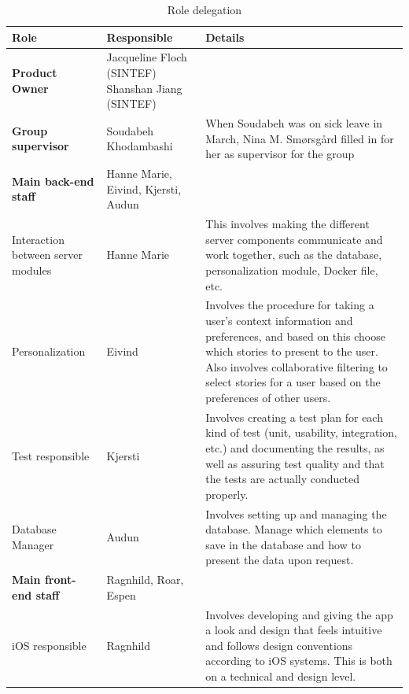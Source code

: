 \begin{table}[!h]
	\small
	\centering
		\caption{Role delegation}
		\begin{tabular}{ | p{2.5cm} | p{2.8cm} | p{12cm} |}
			\hline
			\textbf{Role} & \textbf{Responsible} & \textbf{Details} \\ \hline
			
			\textbf{Product Owner} & Jacqueline Floch (SINTEF) \newline Shanshan Jiang (SINTEF) & \\ \hline
			
			\textbf{Group supervisor} & Soudabeh Khodambashi & When Soudabeh was on sick leave in March, Nina M. Smørsgård filled in for her as supervisor for the group\\ \hline
			
			\textbf{Main back-end staff} & Hanne Marie, Eivind, Kjersti, Audun & \\ \hline
			
			Interaction between server modules & Hanne Marie & This involves making the different server components communicate and work together, such as the database, personalization module, Docker file, etc. \\ \hline
			
			Personalization & Eivind & Involves the procedure for taking a user's context information and preferences, and based on this choose which stories to present to the user. Also involves collaborative filtering to select stories for a user based on the preferences of other users. \\ \hline
			
			Test responsible & Kjersti & Involves creating a test plan for each kind of test (unit, usability, integration, etc.) and documenting the results, as well as assuring test quality and that the tests are actually conducted properly. \\ \hline
			
			Database Manager & Audun & Involves setting up and managing the database. Manage which elements to save in the database and how to present the data upon request. \\ \hline
			
			\textbf{Main front-end staff} & Ragnhild, Roar, Espen & \\ \hline
			
			iOS responsible & Ragnhild & Involves developing and giving the app a look and design that feels intuitive and follows design conventions according to iOS systems. This is both on a technical and design level. \\ \hline
			

\end{tabular}
\end{table}
